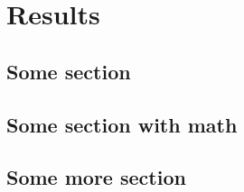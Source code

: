 \chapter{Results}
\blindtext
\section{Some section}
\Blindtext
\Blindenumerate
\Blinditemize
\section{Some section with math}
\blindmathpaper
\Blindtext
\section{Some more section}
\Blindtext
